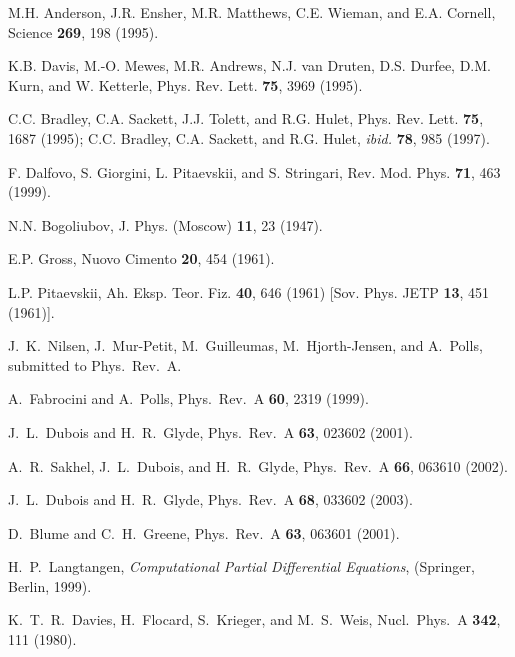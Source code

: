   \begin{thebibliography}{999}%
  \footnotesize
  M.H. Anderson, J.R. Ensher, M.R. Matthews, C.E. Wieman, and E.A. Cornell, 
   Science {\bf 269}, 198 (1995).

  K.B. Davis, M.-O. Mewes, M.R. Andrews, N.J. van Druten, D.S. Durfee, D.M. Kurn, and W. Ketterle,
  Phys. Rev. Lett. {\bf 75}, 3969 (1995).

  C.C. Bradley, C.A. Sackett, J.J. Tolett, and R.G. Hulet, Phys. Rev. Lett. {\bf 75}, 1687
  (1995); C.C. Bradley, C.A. Sackett, and R.G. Hulet, {\em ibid.} {\bf 78}, 985 (1997).

  F. Dalfovo, S. Giorgini, L. Pitaevskii, and S. Stringari, Rev. Mod. Phys. {\bf 71}, 463
  (1999).

  N.N. Bogoliubov, J. Phys. (Moscow) {\bf 11}, 23 (1947).

  E.P. Gross, Nuovo Cimento {\bf 20}, 454 (1961).

  L.P. Pitaevskii, Ah. Eksp. Teor. Fiz. {\bf 40}, 646 (1961) [Sov. Phys. JETP {\bf 13},
  451 (1961)].

 J.~K.~Nilsen, J.~Mur-Petit,
  M.~Guilleumas, M.~Hjorth-Jensen, 
  and A.~Polls, submitted to Phys.~Rev.~A.

 A.~Fabrocini and A.~Polls, Phys.~Rev.~A {\bf 60},
  2319 (1999). 


 J.~L.~Dubois and H.~R.~Glyde, Phys.~Rev.~A {\bf 63},
  023602 (2001). 

 A.~R.~Sakhel, J.~L.~Dubois, and H.~R.~Glyde,
  Phys.~Rev.~A {\bf 66}, 063610 (2002). 

 J.~L.~Dubois and H.~R.~Glyde, Phys.~Rev.~A {\bf 68},
  033602 (2003).

 D.~Blume and C.~H.~Greene, Phys.~Rev.~A {\bf 63},
  063601 (2001).

 H.~P.~Langtangen, {\em Computational Partial Differential Equations},
(Springer, Berlin, 1999).

 K.~T.~R.~Davies, H.~Flocard, S.~Krieger, and M.~S.~Weis,
 Nucl.~Phys.~A {\bf 342}, 111 (1980).

\end{thebibliography}













